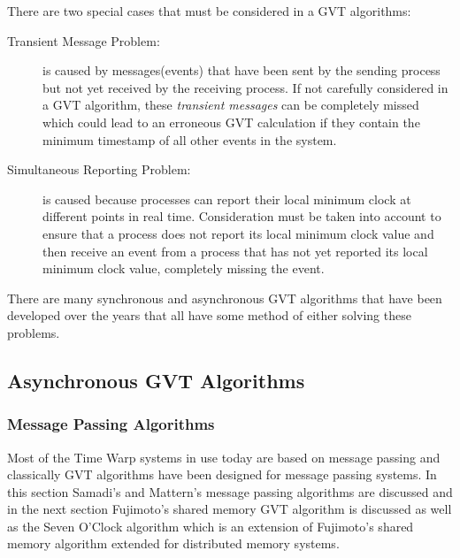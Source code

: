 \documentclass[11pt]{book}
\begin{document}
There are two special cases that must be considered in a GVT algorithms:

\begin{description}
    \item[Transient Message Problem:] is caused by messages(events) that have been sent by the
      sending process but not yet received by the receiving process.  If not carefully considered in
      a GVT algorithm, these \emph{transient messages} can be completely missed which could lead to
      an erroneous GVT calculation if they contain the minimum timestamp of all other events in the
      system.
    \item[Simultaneous Reporting Problem:] is caused because processes can report their local
      minimum clock at different points in real time.  Consideration must be taken into account to
      ensure that a process does not report its local minimum clock value and then receive an event
      from a process that has not yet reported its local minimum clock value, completely missing the
      event.
\end{description}

\noindent
There are many synchronous and asynchronous GVT algorithms that have been developed over the years
that all have some method of either solving these problems.

\subsection{Asynchronous GVT Algorithms}

\subsubsection{Message Passing Algorithms}

Most of the Time Warp systems in use today are based on message passing and classically GVT
algorithms have been designed for message passing systems.  In this section Samadi's and Mattern's
message passing algorithms \cite{samadi-85, mattern-93} are discussed and in the next section
Fujimoto's shared memory GVT algorithm \cite{fujimoto-94} is discussed as well as the Seven O'Clock
algorithm \cite{bauer-05} which is an extension of Fujimoto's shared memory algorithm extended
for distributed memory systems.
\end{document}
